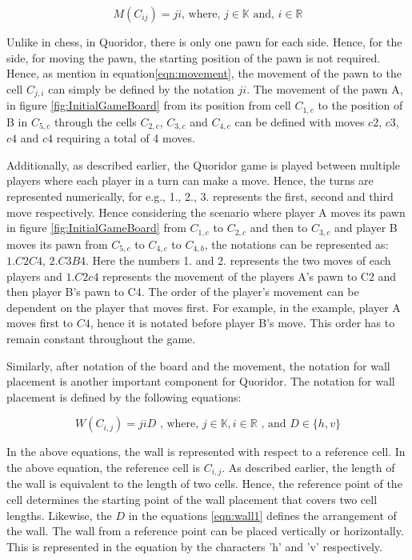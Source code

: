 \begin{equation}\label{eqn:movement}
M(C_{ij}) = ji \text{, where, } j \in \mathbb{K} \text{ and, } i \in \mathbb{R}     
\end{equation}

Unlike in chess, in Quoridor, there is only one pawn for each side. Hence, for the side, for moving the pawn, the starting position of the pawn is not required. Hence, as mention in equation\eqref{eqn:movement}, the movement of the pawn to the cell $C_{j, i}$ can simply be defined by the notation $ji$. The movement of the pawn A, in figure \ref{fig:InitialGameBoard} from its position from cell $C_{1, c}$ to the position of B in $C_{5,c}$ through the cells $C_{2, c}$, $C_{3, c}$ and $C_{4, c}$ can be defined with moves $c2$, $c3$, $c4$ and $c4$ requiring a total of 4 moves.

Additionally, as described earlier, the Quoridor game is played between multiple players where each player in a turn can make a move. Hence, the turns are represented numerically, for e.g., 1., 2., 3. represents the first, second and third move respectively. Hence considering the scenario where player A moves its pawn in figure \ref{fig:InitialGameBoard} from $C_{1,c}$ to $C_{2,c}$ and then to $C_{3,c}$ and player B moves its pawn from $C_{5,c}$ to $C_{4,c}$ to $C_{4,b}$, the notations can be represented as: $1. C2 C4$, $2. C3 B4$. Here the numbers 1. and 2. represents the two moves of each players and $1. C2 c4$ represents the movement of the players A's pawn to C2 and then player B's pawn to C4. The order of the player's movement can be dependent on the player that moves first. For example, in the example, player A moves first to $C4$, hence it is notated before player B's move. This order has to remain constant throughout the game.

Similarly, after notation of the board and the movement, the notation for wall placement is another important component for Quoridor. The notation for wall placement is defined by the following equations:

\begin{equation}\label{eqn:wall1}
W(C_{i,j}) = jiD \text{ , where, } j \in \mathbb{K}, i \in \mathbb{R}  \text{ , and } D \in \{h, v\}
\end{equation}

In the above equations, the wall is represented with respect to a reference cell. In the above equation, the reference cell is $C_{i, j}$. As described earlier, the length of the wall is equivalent to the length of two cells. Hence, the reference point of the cell determines the starting point of the wall placement that covers two cell lengths. Likewise, the $D$ in the equations \eqref{eqn:wall1} defines the arrangement of the wall. The wall from a reference point can be placed vertically or horizontally. This is represented in the equation by the characters 'h' and 'v' respectively.

